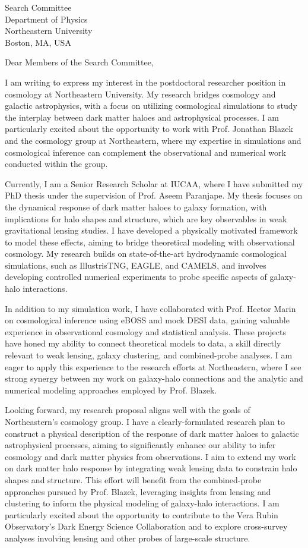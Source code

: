\documentclass[11pt]{letter}
\date{December 4, 2024}
\begin{document}
\begin{letter}{Search Committee \\ Department of Physics \\ Northeastern University \\ Boston, MA, USA}

\opening{Dear Members of the Search Committee,}

I am writing to express my interest in the postdoctoral researcher position in cosmology at Northeastern University. My research bridges cosmology and galactic astrophysics, with a focus on utilizing cosmological simulations to study the interplay between dark matter haloes and astrophysical processes. I am particularly excited about the opportunity to work with Prof. Jonathan Blazek and the cosmology group at Northeastern, where my expertise in simulations and cosmological inference can complement the observational and numerical work conducted within the group.

Currently, I am a Senior Research Scholar at IUCAA, where I have submitted my PhD thesis under the supervision of Prof. Aseem Paranjape. My thesis focuses on the dynamical response of dark matter haloes to galaxy formation, with implications for halo shapes and structure, which are key observables in weak gravitational lensing studies. I have developed a physically motivated framework to model these effects, aiming to bridge theoretical modeling with observational cosmology. My research builds on state-of-the-art hydrodynamic cosmological simulations, such as IllustrisTNG, EAGLE, and CAMELS, and involves developing controlled numerical experiments to probe specific aspects of galaxy-halo interactions.

In addition to my simulation work, I have collaborated with Prof. Hector Marin on cosmological inference using eBOSS and mock DESI data, gaining valuable experience in observational cosmology and statistical analysis. These projects have honed my ability to connect theoretical models to data, a skill directly relevant to weak lensing, galaxy clustering, and combined-probe analyses. I am eager to apply this experience to the research efforts at Northeastern, where I see strong synergy between my work on galaxy-halo connections and the analytic and numerical modeling approaches employed by Prof. Blazek.

Looking forward, my research proposal aligns well with the goals of Northeastern’s cosmology group. I have a clearly-formulated research plan to construct a physical description of the response of dark matter haloes to galactic astrophysical processes, aiming to significantly enhance our ability to infer cosmology and dark matter physics from observations. I aim to extend my work on dark matter halo response by integrating weak lensing data to constrain halo shapes and structure. This effort will benefit from the combined-probe approaches pursued by Prof. Blazek, leveraging insights from lensing and clustering to inform the physical modeling of galaxy-halo interactions. I am particularly excited about the opportunity to contribute to the Vera Rubin Observatory’s Dark Energy Science Collaboration and to explore cross-survey analyses involving lensing and other probes of large-scale structure.


\end{letter}
\end{document}

